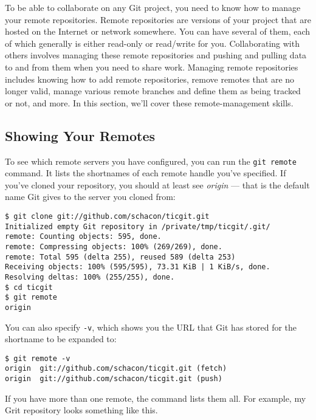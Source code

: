 \documentclass[a4paper]{book}
\begin{document}
To be able to collaborate on any Git project, you need to know how to manage your remote repositories. Remote repositories are versions of your project that are hosted on the Internet or network somewhere. You can have several of them, each of which generally is either read-only or read/write for you. Collaborating with others involves managing these remote repositories and pushing and pulling data to and from them when you need to share work. Managing remote repositories includes knowing how to add remote repositories, remove remotes that are no longer valid, manage various remote branches and define them as being tracked or not, and more. In this section, we'll cover these remote-management skills.

\subsection{Showing Your Remotes}

To see which remote servers you have configured, you can run the \texttt{git remote} command. It lists the shortnames of each remote handle you've specified. If you've cloned your repository, you should at least see \emph{origin} --- that is the default name Git gives to the server you cloned from:

\begin{shaded}\begin{verbatim}
$ git clone git://github.com/schacon/ticgit.git
Initialized empty Git repository in /private/tmp/ticgit/.git/
remote: Counting objects: 595, done.
remote: Compressing objects: 100% (269/269), done.
remote: Total 595 (delta 255), reused 589 (delta 253)
Receiving objects: 100% (595/595), 73.31 KiB | 1 KiB/s, done.
Resolving deltas: 100% (255/255), done.
$ cd ticgit
$ git remote
origin
\end{verbatim}\end{shaded}

You can also specify \texttt{-v}, which shows you the URL that Git has stored for the shortname to be expanded to:

\begin{shaded}\begin{verbatim}
$ git remote -v
origin  git://github.com/schacon/ticgit.git (fetch)
origin  git://github.com/schacon/ticgit.git (push)
\end{verbatim}\end{shaded}

If you have more than one remote, the command lists them all. For example, my Grit repository looks something like this.
\end{document}
